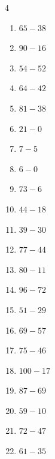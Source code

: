 \begin{multicols}{4}
\begin{enumerate}
\columnbreak %

  \item $65-38$
        \phantom{$=27$}

  \item $90-16$
        \phantom{$=74$}

  \item $54-52$
        \phantom{$=2$}

  \item $64-42$
        \phantom{$=22$}

  \item $81-38$
        \phantom{$=43$}

  \item $21-0$
        \phantom{$=21$}

  \item $7-5$
        \phantom{$=2$}

  \item $6-0$
        \phantom{$=6$}

  \item $73-6$
        \phantom{$=67$}

  \item $44-18$
        \phantom{$=26$}

  \item $39-30$
        \phantom{$=9$}

  \item $77-44$
        \phantom{$=33$}

  \item $80-11$
        \phantom{$=69$}

  \item $96-72$
        \phantom{$=24$}

  \item $51-29$
        \phantom{$=22$}

  \item $69-57$
        \phantom{$=12$}

  \item $75-46$
        \phantom{$=29$}

  \item $100-17$
        \phantom{$=83$}

  \item $87-69$
        \phantom{$=18$}

  \item $59-10$
        \phantom{$=49$}

  \item $72-47$
        \phantom{$=25$}

  \item $61-35$
        \phantom{$=26$}


\end{enumerate}
\end{multicols}
